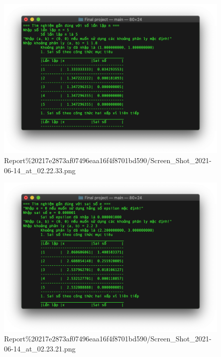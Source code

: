 \begin{figure}[htbp]
\centering
\includegraphics{Report 217e2873af07496eaa16f4f8701bd590/Screen_Shot_2021-06-14_at_02.22.33.png}
\caption{Report\%20217e2873af07496eaa16f4f8701bd590/Screen\_Shot\_2021-06-14\_at\_02.22.33.png}
\end{figure}

\begin{figure}[htbp]
\centering
\includegraphics{Report 217e2873af07496eaa16f4f8701bd590/Screen_Shot_2021-06-14_at_02.23.21.png}
\caption{Report\%20217e2873af07496eaa16f4f8701bd590/Screen\_Shot\_2021-06-14\_at\_02.23.21.png}
\end{figure}


